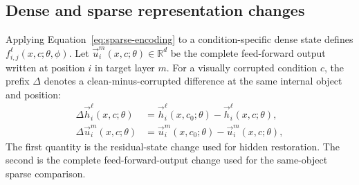 \subsection{Dense and sparse representation changes}

Applying Equation~\ref{eq:sparse-encoding} to a condition-specific dense state defines $f_{i,j}^{\ell}(x,c;\theta,\phi)$. Let $\vec{u}_{i}^{m}(x,c;\theta)\in\mathbb{R}^{d}$ be the complete feed-forward output written at position $i$ in target layer $m$. For a visually corrupted condition $c$, the prefix $\Delta$ denotes a clean-minus-corrupted difference at the same internal object and position:
\begin{align}
    \Delta\vec{h}_{i}^{\ell}(x,c;\theta)
    &=\vec{h}_{i}^{\ell}(x,c_0;\theta)-\vec{h}_{i}^{\ell}(x,c;\theta),
    \label{eq:hidden-difference}\\
    \Delta\vec{u}_{i}^{m}(x,c;\theta)
    &=\vec{u}_{i}^{m}(x,c_0;\theta)-\vec{u}_{i}^{m}(x,c;\theta),
    \label{eq:feedforward-difference}
\end{align}
The first quantity is the residual-state change used for hidden restoration. The second is the complete feed-forward-output change used for the same-object sparse comparison.

